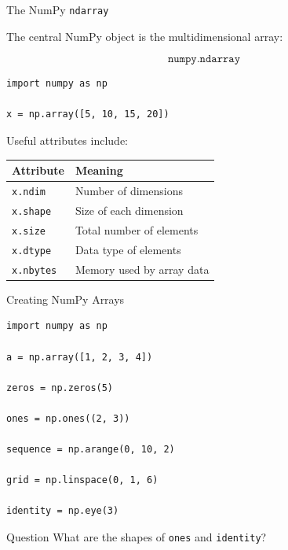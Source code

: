 \documentclass[11pt,aspectratio=43]{beamer}
\begin{document}
\begin{frame}[fragile]{The NumPy \texttt{ndarray}}

The central NumPy object is the multidimensional array:

\[
\texttt{numpy.ndarray}
\]

\begin{lstlisting}
import numpy as np

x = np.array([5, 10, 15, 20])
\end{lstlisting}

Useful attributes include:

\begin{center}
\begin{tabular}{ll}
\toprule
Attribute & Meaning \\
\midrule
\texttt{x.ndim}  & Number of dimensions \\
\texttt{x.shape} & Size of each dimension \\
\texttt{x.size}  & Total number of elements \\
\texttt{x.dtype} & Data type of elements \\
\texttt{x.nbytes}& Memory used by array data \\
\bottomrule
\end{tabular}
\end{center}

\end{frame}

\begin{frame}[fragile]{Creating NumPy Arrays}

\begin{lstlisting}
import numpy as np

a = np.array([1, 2, 3, 4])

zeros = np.zeros(5)

ones = np.ones((2, 3))

sequence = np.arange(0, 10, 2)

grid = np.linspace(0, 1, 6)

identity = np.eye(3)
\end{lstlisting}

\pause

\begin{block}{Question}
What are the shapes of \texttt{ones} and \texttt{identity}?
\end{block}

\end{frame}
\end{document}
